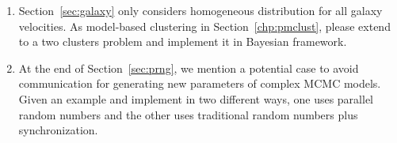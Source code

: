 \begin{enumerate}[label=\thechapter-\arabic*]
\item
Section~\ref{sec:galaxy} only considers homogeneous distribution for all
galaxy velocities. As model-based clustering in Section~\ref{chp:pmclust},
please extend to a two clusters problem and implement it in Bayesian
framework.

\item
At the end of Section~\ref{sec:prng}, we mention a potential case to avoid
communication for generating new parameters of complex MCMC models.
Given an example and implement in two different ways, one uses parallel
random numbers and the other uses traditional random numbers plus
synchronization.

\end{enumerate}


